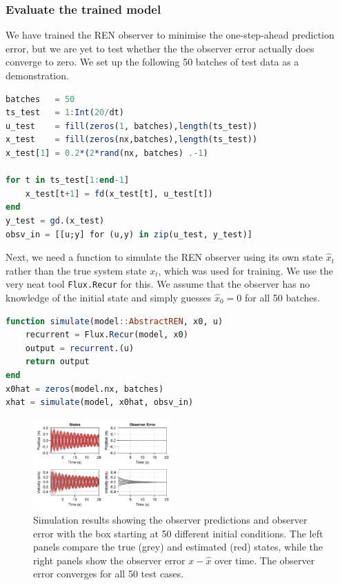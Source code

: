 \subsubsection{Evaluate the trained model} \label{sec:observer-evaluate}

We have trained the REN observer to minimise the one-step-ahead prediction error, but we are yet to test whether the the observer error actually does converge to zero. We set up the following 50 batches of test data as a demonstration.
\begin{lstlisting}[language = Julia]
batches   = 50
ts_test   = 1:Int(20/dt)
u_test    = fill(zeros(1, batches),length(ts_test))
x_test    = fill(zeros(nx,batches),length(ts_test))
x_test[1] = 0.2*(2*rand(nx, batches) .-1)

for t in ts_test[1:end-1]
    x_test[t+1] = fd(x_test[t], u_test[t])
end
y_test = gd.(x_test)
obsv_in = [[u;y] for (u,y) in zip(u_test, y_test)]
\end{lstlisting}

Next, we need a function to simulate the REN observer using its own state $\hat{x}_t$ rather than the true system state $x_t$, which was used for training. We use the very neat tool \verb|Flux.Recur| for this. We assume that the observer has no knowledge of the initial state and simply guesses $\hat{x}_0 = 0$ for all 50 batches.
\begin{lstlisting}[language = Julia]
function simulate(model::AbstractREN, x0, u)
    recurrent = Flux.Recur(model, x0)
    output = recurrent.(u)
    return output
end
x0hat = zeros(model.nx, batches)
xhat = simulate(model, x0hat, obsv_in)
\end{lstlisting}

\begin{figure}
    \centering
    \includegraphics[width=0.47\textwidth]{Images/ren_box_obsv.pdf}
    \caption{Simulation results showing the observer predictions and observer error with the box starting at 50 different initial conditions. The left panels compare the true (grey) and estimated (red) states, while the right panels show the observer error $x - \hat{x}$ over time. The observer error converges for all 50 test cases.}
    \label{fig:observer-results}
\end{figure}

